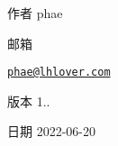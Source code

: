 \begin{DoxyAuthor}{作者}
phae 
\end{DoxyAuthor}


邮箱 

\href{mailto:phae@lhlover.com}{\tt phae@lhlover.\+com} \begin{DoxyVersion}{版本}
1.. 
\end{DoxyVersion}
\begin{DoxyDate}{日期}
2022-\/06-\/20 
\end{DoxyDate}
